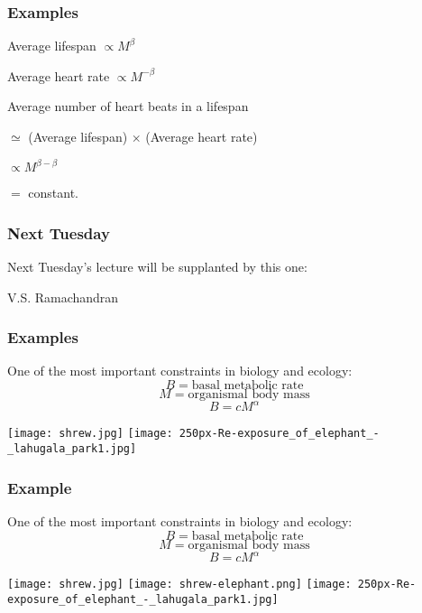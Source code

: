 \begin{frame}
  \frametitle{Examples}

  Average lifespan $\propto M^{\beta}$

  Average heart rate $\propto M^{-\beta}$

  Average number of heart beats in a lifespan
  \begin{center}
  $\simeq$ (Average lifespan) $\times$ (Average heart rate)

  $ \propto M^{\beta - \beta} $

  $ = $ constant.
  \end{center}

\end{frame}

\begin{frame}
  \frametitle{Next Tuesday}

Next Tuesday's lecture will
be supplanted by this one:

V.S. Ramachandran




\end{frame}

\begin{frame}
  \frametitle{Examples}

One of the most important constraints in biology and ecology:
  $$B = \mbox{basal metabolic rate}$$
  $$M = \mbox{organismal body mass}$$
  $$B = c M^\alpha$$


  \texttt{[image: shrew.jpg]}
  \hfill
  \hfill
  \texttt{[image: 250px-Re-exposure\_of\_elephant\_-\_lahugala\_park1.jpg]}

\end{frame}

\begin{frame}
  \frametitle{Example}

One of the most important constraints in biology and ecology:
  $$B = \mbox{basal metabolic rate}$$
  $$M = \mbox{organismal body mass}$$
  $$B = c M^\alpha$$


  \texttt{[image: shrew.jpg]}
  \hfill
  \texttt{[image: shrew-elephant.png]}
  \hfill
  \texttt{[image: 250px-Re-exposure\_of\_elephant\_-\_lahugala\_park1.jpg]}

\end{frame}

